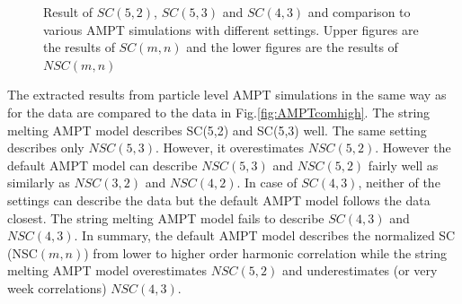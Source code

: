 \begin{figure}[h]
\begin{center}
        \caption{Result of  $SC(5,2)$, $SC(5,3)$ and $SC(4,3)$ and comparison to various AMPT simulations with different settings.  Upper figures are the results of $SC(m,n)$ and the lower figures are the results of $NSC(m,n)$}
        \label{AMPTcomhigh}
        \end{center}   
     \end{figure}
     
     
The extracted results  from particle level AMPT simulations in the same way as for the data are compared to the data in Fig.\ref{fig:AMPTcomhigh}.
The string melting AMPT model describes SC(5,2) and SC(5,3) well. The same setting describes only $NSC(5,3)$. However, it overestimates $NSC(5,2)$. 
However the default AMPT model can describe $NSC(5,3)$ and $NSC(5,2)$ fairly well as similarly as $NSC(3,2)$ and $NSC(4,2)$.
In case of $SC(4,3)$, neither of the settings can describe the data but the default AMPT model follows the data closest. 
The string melting AMPT model fails to describe $SC(4,3)$ and $NSC(4,3)$.
In summary, the default AMPT model describes the normalized SC (NSC$(m,n)$) from lower to higher order harmonic correlation while the string melting AMPT model overestimates $NSC(5,2)$ and 
underestimates (or very week correlations) $NSC(4,3)$. 
     

